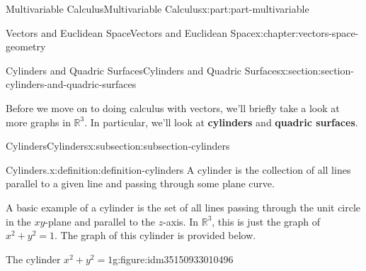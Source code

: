 \documentclass[twoside,10pt,]{book}
\newcommand{\terminology}[1]{\textbf{#1}}
\numberwithin{equation}{part}
\newlength{\qrsize}
\newlength{\previewwidth}
\newcommand{\RR}{\mathbb{R}}
\begin{document}
\begin{partptx}{Multivariable Calculus}{}{Multivariable Calculus}{}{}{x:part:part-multivariable}
\begin{chapterptx}{Vectors and Euclidean Space}{}{Vectors and Euclidean Space}{}{}{x:chapter:vectors-space-geometry}
%
%
\typeout{************************************************}
\typeout{************************************************}
%
\begin{sectionptx}{Cylinders and Quadric Surfaces}{}{Cylinders and Quadric Surfaces}{}{}{x:section:section-cylinders-and-quadric-surfaces}
\begin{introduction}{}%
Before we move on to doing calculus with vectors, we'll briefly take a look at more graphs in \(\RR^{3}\). In particular, we'll look at \terminology{cylinders} and \terminology{quadric surfaces}.%
\end{introduction}%
%
%
\typeout{************************************************}
\typeout{************************************************}
%
\begin{subsectionptx}{Cylinders}{}{Cylinders}{}{}{x:subsection:subsection-cylinders}
\begin{definition}{Cylinders.}{x:definition:definition-cylinders}%
%
A cylinder is the collection of all lines parallel to a given line and passing through some plane curve.%
\end{definition}
A basic example of a cylinder is the set of all lines passing through the unit circle in the \(xy\)-plane and parallel to the \(z\)-axis. In \(\RR^{3}\), this is just the graph of \(x^{2}+y^{2}=1\). The graph of this cylinder is provided below.%
\begin{figureptx}{The cylinder \(x^2+y^2=1\)}{g:figure:idm35150933010496}{}%
\centering
\setlength{\qrsize}{9em}
\setlength{\previewwidth}{\linewidth}
\addtolength{\previewwidth}{-\qrsize}
\begin{tcbraster}[raster columns=2, raster column skip=1pt, raster halign=center, raster force size=false, raster left skip=0pt, raster right skip=0pt]%
\begin{tcolorbox}[previewstyle, width=\previewwidth]%
%

\end{tcolorbox}
\end{tcbraster}
\end{figureptx}
\end{subsectionptx}
\end{sectionptx}
\end{chapterptx}
\end{partptx}
\end{document}
